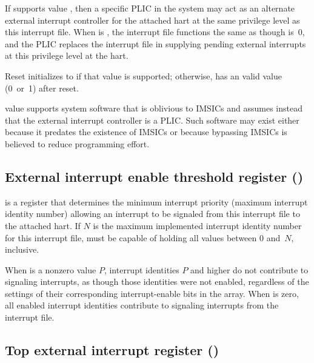 If  supports value , then a specific PLIC
in the system may act as an alternate external interrupt controller for
the attached hart at the same privilege level as this interrupt file.
When  is , the interrupt file functions the
same as though  is~0, and the PLIC replaces the interrupt
file in supplying pending external interrupts at this privilege level
at the hart.

Reset initializes  to  if that value is
supported;
otherwise,  has an {\unspecified} valid value (0~or~1)
after reset.

\begin{commentary}
 value  supports system software that is
oblivious to IMSICs and assumes instead that the external interrupt
controller is a PLIC.
Such software may exist either because it predates the existence of
IMSICs or because bypassing IMSICs is believed to reduce programming
effort.
\end{commentary}

\subsection{External interrupt enable threshold register ()}

 is a {\WLRL} register that determines the minimum
interrupt priority (maximum interrupt identity number) allowing an
interrupt to be signaled from this interrupt file to the attached hart.
If $N$ is the maximum implemented interrupt identity number for this
interrupt file,  must be capable of holding all values
between 0 and~$N$, inclusive.

When  is a nonzero value $P$, interrupt identities $P$
and higher do not contribute to signaling interrupts, as though those
identities were not enabled, regardless of the settings of their
corresponding interrupt-enable bits in the  array.
When  is zero, all enabled interrupt identities
contribute to signaling interrupts from the interrupt file.

\subsection{Top external interrupt register ()}

